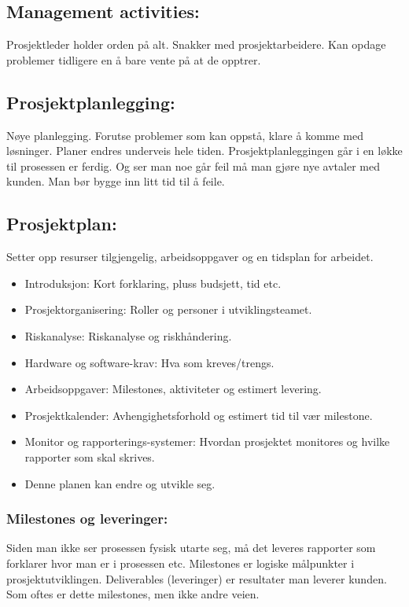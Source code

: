 \documentclass[11pt]{article}
\begin{document}
\subsection{Management activities:}
\label{sec-5.1}

   Prosjektleder holder orden på alt. 
   Snakker med prosjektarbeidere. 
   Kan opdage problemer tidligere en å bare vente på at de opptrer.
\subsection{Prosjektplanlegging:}
\label{sec-5.2}

   Nøye planlegging. 
   Forutse problemer som kan oppstå, klare å komme med løsninger. 
   Planer endres underveis hele tiden. 
   Prosjektplanleggingen går i en løkke til prosessen er ferdig. 
   Og ser man noe går feil må man gjøre nye avtaler med kunden. 
   Man bør bygge inn litt tid til å feile.
\subsection{Prosjektplan:}
\label{sec-5.3}

   Setter opp resurser tilgjengelig, arbeidsoppgaver og en tidsplan for arbeidet.
\begin{itemize}
\item Introduksjon: Kort forklaring, pluss budsjett, tid etc.
\item Prosjektorganisering: Roller og personer i utviklingsteamet.
\item Riskanalyse: Riskanalyse og riskhåndering.
\item Hardware og software-krav: Hva som kreves/trengs.
\item Arbeidsoppgaver: Milestones, aktiviteter og estimert levering.
\item Prosjektkalender: Avhengighetsforhold og estimert tid til vær milestone.
\item Monitor og rapporterings-systemer: Hvordan prosjektet monitores og hvilke rapporter som skal skrives.
\item Denne planen kan endre og utvikle seg.
\end{itemize}
\subsubsection{Milestones og leveringer:}
\label{sec-5.3.1}

    Siden man ikke ser prosessen fysisk utarte seg, må det leveres rapporter som forklarer hvor 
    man er i prosessen etc. Milestones er logiske målpunkter i prosjektutviklingen. 
    Deliverables (leveringer) er resultater man leverer kunden. Som oftes er dette milestones, men ikke andre veien.
\end{document}
